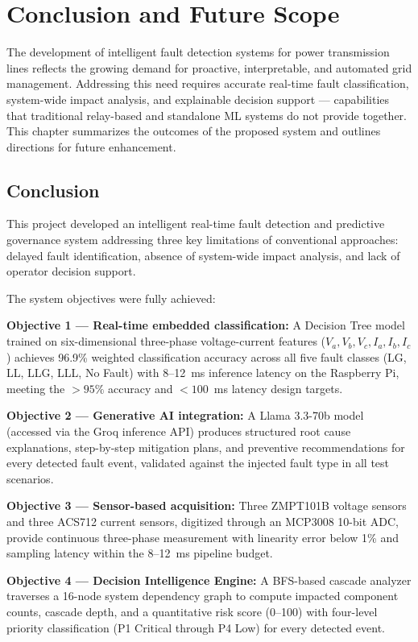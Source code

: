 \chapter{Conclusion and Future Scope}

The development of intelligent fault detection systems for power transmission lines reflects the growing demand for proactive, interpretable, and automated grid management. Addressing this need requires accurate real-time fault classification, system-wide impact analysis, and explainable decision support — capabilities that traditional relay-based and standalone ML systems do not provide together. This chapter summarizes the outcomes of the proposed system and outlines directions for future enhancement.

\section{Conclusion}

This project developed an intelligent real-time fault detection and predictive governance system addressing three key limitations of conventional approaches: delayed fault identification, absence of system-wide impact analysis, and lack of operator decision support.

The system objectives were fully achieved:

\textbf{Objective 1 — Real-time embedded classification:} A Decision Tree model trained on six-dimensional three-phase voltage-current features ($V_a, V_b, V_c, I_a, I_b, I_c$) achieves 96.9\% weighted classification accuracy across all five fault classes (LG, LL, LLG, LLL, No Fault) with 8--12~ms inference latency on the Raspberry Pi, meeting the $>95\%$ accuracy and $<100$~ms latency design targets.

\textbf{Objective 2 — Generative AI integration:} A Llama 3.3-70b model (accessed via the Groq inference API) produces structured root cause explanations, step-by-step mitigation plans, and preventive recommendations for every detected fault event, validated against the injected fault type in all test scenarios.

\textbf{Objective 3 — Sensor-based acquisition:} Three ZMPT101B voltage sensors and three ACS712 current sensors, digitized through an MCP3008 10-bit ADC, provide continuous three-phase measurement with linearity error below 1\% and sampling latency within the 8--12~ms pipeline budget.

\textbf{Objective 4 — Decision Intelligence Engine:} A BFS-based cascade analyzer traverses a 16-node system dependency graph to compute impacted component counts, cascade depth, and a quantitative risk score (0--100) with four-level priority classification (P1 Critical through P4 Low) for every detected event.

